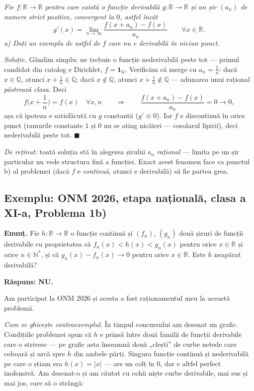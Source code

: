 \emph{Fie $f:\mathbb{R}\to\mathbb{R}$ pentru care există o funcție derivabilă $g:\mathbb{R}\to\mathbb{R}$ și un șir $(a_n)$ de numere strict pozitive, convergent la $0$, astfel încât}
\[
g'(x)=\lim_{n\to\infty}\frac{f(x+a_n)-f(x)}{a_n}\qquad\forall x\in\mathbb{R}.
\]
\emph{a) Dați un exemplu de astfel de $f$ care nu e derivabilă în niciun punct.}

\emph{Soluție.} Gândim simplu: ne trebuie o funcție nederivabilă peste tot --- primul candidat din catalog e Dirichlet, $f=\mathbf{1}_{\mathbb{Q}}$. Verificăm că merge cu $a_n=\frac1n$: dacă $x\in\mathbb{Q}$, atunci $x+\frac1n\in\mathbb{Q}$; dacă $x\notin\mathbb{Q}$, atunci $x+\frac1n\notin\mathbb{Q}$ --- adunarea unui rațional \emph{păstrează clasa}. Deci
\[
f\Big(x+\frac1n\Big)=f(x)\quad\forall x,n
\qquad\Longrightarrow\qquad
\frac{f(x+a_n)-f(x)}{a_n}=0\to0,
\]
așa că ipoteza e satisfăcută cu $g$ constantă ($g'\equiv0$). Iar $f$ e discontinuă în orice punct (ramurile constante $1$ și $0$ nu se ating nicăieri --- corolarul lipirii), deci nederivabilă peste tot. $\blacksquare$

\emph{De reținut:} toată soluția stă în alegerea șirului $a_n$ \emph{rațional} --- limita pe un șir particular nu vede structura fină a funcției. Exact acest fenomen face ca punctul b) al problemei (dacă $f$ e \emph{continuă}, atunci e derivabilă) să fie partea grea.

\subsection*{Exemplu: ONM 2026, etapa națională, clasa a XI-a, Problema 1b)}

\textbf{Enunț.} Fie $h:\mathbb{R}\to\mathbb{R}$ o funcție continuă și $(f_n)$, $(g_n)$ două șiruri de funcții derivabile cu proprietatea că $f_n(x)<h(x)<g_n(x)$ pentru orice $x\in\mathbb{R}$ și orice $n\in\mathbb{N}^*$, și că $g_n(x)-f_n(x)\to0$ pentru orice $x\in\mathbb{R}$. Este $h$ neapărat derivabilă?

\textbf{Răspuns: NU.}

Am participat la ONM 2026 și acesta a fost raționamentul meu la această problemă.

\emph{Cum se ghicește contraexemplul.} În timpul concursului am desenat un grafic. Condițiile problemei spun că $h$ e prinsă între două familii de funcții derivabile care o strivesc --- pe grafic asta înseamnă două „clești'' de curbe netede care coboară și urcă spre $h$ din ambele părți. Singura funcție continuă și nederivabilă pe care o știam era $h(x)=|x|$ --- are un colț în $0$, dar e altfel perfect inofensivă. Am desenat-o și am căutat cu ochii niște curbe derivabile, mai sus și mai jos, care să o strângă:

